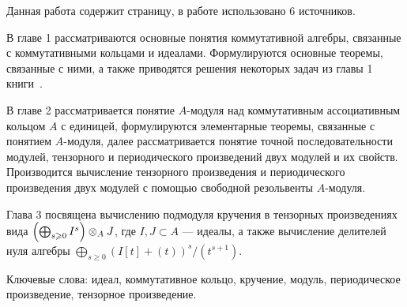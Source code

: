     Данная работа содержит \pageref{LastPage} страницу, в работе использовано 6 источников.

    В главе 1 рассматриваются основные понятия коммутативной алгебры, связанные с коммутативными
    кольцами и идеалами. Формулируются основные теоремы, связанные с ними, а также приводятся 
    решения некоторых задач из главы 1 книги~\cite{A-M}. 

    В главе 2 рассматривается понятие $A$-модуля 
    над коммутативным ассоциативным кольцом $A$ с единицей, формулируются элементарные теоремы, связанные с понятием $A$-модуля, далее
    рассматривается понятие точной последовательности модулей, тензорного и периодического 
    произведений двух модулей и их свойств. Производится вычисление тензорного произведения 
    и периодического произведения двух модулей  с помощью свободной резольвенты $A$-модуля. 
    
    Глава 3 посвящена вычислению подмодуля кручения в тензорных произведениях вида 
    $\left(\bigoplus_{s \geqslant 0} I^s \right) \otimes_A J$, где $I, J \subset A$ --- идеалы, а также вычисление делителей нуля алгебры 
    $\bigoplus_{s \geq 0}{(I[t] + (t))^s / (t^{s + 1})}$.

    Ключевые слова: идеал,
    коммутативное кольцо,
    кручение,
    модуль,
    периодическое произведение,
    тензорное произведение.
    
